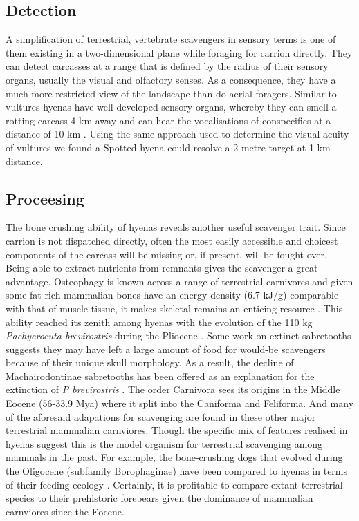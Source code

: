 \documentclass[a4paper,12pt]{article}
\begin{document}
\subsection*{Detection}
A simplification of terrestrial, vertebrate scavengers in sensory terms is one of them existing in a two-dimensional plane while foraging for carrion directly.
They can detect carcasses at a range that is defined by the radius of their sensory organs, usually the visual and olfactory senses.
As a consequence, they have a much more restricted view of the landscape than do aerial foragers.
Similar to vultures hyenas have well developed sensory organs, whereby they can smell a rotting carcass 4 km away and can hear the vocalisations of conspecifics at a distance of 10 km \citep{mills1989comparative}. 
Using the same approach \cite{spiegel2013factors} used to determine the visual acuity of vultures we found a Spotted hyena could resolve a 2 metre target at 1 km distance. 

\subsection*{Proceesing}
The bone crushing ability of hyenas reveals another useful scavenger trait.
Since carrion is not dispatched directly, often the most easily accessible and choicest components of the carcass will be missing or, if present, will be fought over.
Being able to extract nutrients from remnants gives the scavenger a great advantage.
Osteophagy is known across a range of terrestrial carnivores and given some fat-rich mammalian bones have an energy density (6.7 kJ/g) comparable with that of muscle tissue, it makes skeletal remains an enticing resource \citep{brown1989study}.
This ability reached its zenith among hyenas with the evolution of the 110 kg \textit{Pachycrocuta brevirostris} during the Pliocene \citep{palmqvist2011giant}.
Some work on extinct sabretooths suggests they may have left a large amount of food for would-be scavengers because of their unique skull morphology.
As a result, the decline of Machairodontinae sabretooths has been offered as an explanation for the extinction of \textit{P brevirostris} \citep{palmqvist2011giant}.
The order Carnivora sees its origins in the Middle Eocene (56-33.9 Mya) where it split into the Caniforma and Feliforma.
And many of the aforesaid adapations for scavenging are found in these other major terrestrial mammalian carnviores.
Though the specific mix of features realised in hyenas suggest this is the model organism for terrestrial scavenging among mammals in the past.
For example, the bone-crushing dogs that evolved during the Oligocene (subfamily Borophaginae) have been compared to hyenas in terms of their feeding ecology \citep{van2003chapter,martin2016pursuit}.
Certainly, it is profitable to compare extant terrestrial species to their prehistoric forebears given the dominance of mammalian carnviores since the Eocene.
\end{document}
